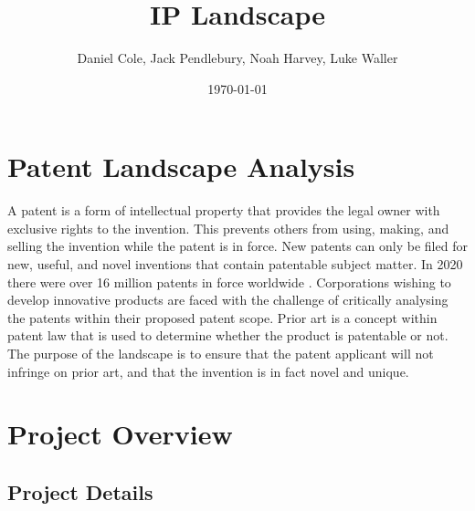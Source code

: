 \documentclass [12pt]{article}
\begin{document}
\title{\bf IP Landscape}
\author{Daniel Cole, Jack Pendlebury, Noah Harvey, Luke Waller}
\date{\today}
\maketitle
\thispagestyle{empty}

\newpage
{}
\setcounter{page}{1}
\tableofcontents
\newpage

\listoffigures
\listoftables



\newpage
\section{Patent Landscape Analysis}\label{sec:PLA}

A patent is a form of intellectual property that provides the legal owner with exclusive rights to the invention.
This prevents others from using, making, and selling the invention while the patent is in force.
New patents can only be filed for new, useful, and novel inventions that contain patentable subject matter.
In 2020 there were over 16 million patents in force worldwide \cite{WIPO_ref}.
Corporations wishing to develop innovative products are faced with the challenge of critically analysing the patents within their proposed patent scope.
Prior art is a concept within patent law that is used to determine whether the product is patentable or not.
The purpose of the landscape is to ensure that the patent applicant will not infringe on prior art, and that the invention is in fact novel and unique.

\section{Project Overview}\label{sec:project_overview}
\subsection{Project Details}\label{sec:project_details}
\end{document}
